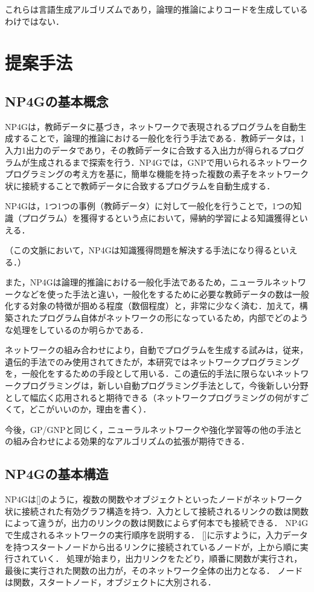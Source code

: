 \documentclass[exploratorypaper]{jsaiart} %
\begin{document}
これらは言語生成アルゴリズムであり，論理的推論によりコードを生成しているわけではない．

\section{提案手法}
\subsection{NP4Gの基本概念}
NP4Gは，教師データに基づき，ネットワークで表現されるプログラムを自動生成することで，論理的推論における一般化を行う手法である．教師データは，1入力1出力のデータであり，その教師データに合致する入出力が得られるプログラムが生成されるまで探索を行う．NP4Gでは，GNPで用いられるネットワークプログラミングの考え方を基に，簡単な機能を持った複数の素子をネットワーク状に接続することで教師データに合致するプログラムを自動生成する．

NP4Gは，1つ1つの事例（教師データ）に対して一般化を行うことで，1つの知識（プログラム）を獲得するという点において，帰納的学習による知識獲得といえる．

（この文脈において，NP4Gは知識獲得問題を解決する手法になり得るといえる．）

また，NP4Gは論理的推論における一般化手法であるため，ニューラルネットワークなどを使った手法と違い，一般化をするために必要な教師データの数は一般化する対象の特徴が掴める程度（数個程度）と，非常に少なく済む．加えて，構築されたプログラム自体がネットワークの形になっているため，内部でどのような処理をしているのか明らかである．

ネットワークの組み合わせにより，自動でプログラムを生成する試みは，従来，遺伝的手法でのみ使用されてきたが，本研究ではネットワークプログラミングを，一般化をするための手段として用いる．この遺伝的手法に限らないネットワークプログラミングは，新しい自動プログラミング手法として，今後新しい分野として幅広く応用されると期待できる（ネットワークプログラミングの何がすごくて，どこがいいのか，理由を書く）．

今後，GP/GNPと同じく，ニューラルネットワークや強化学習等の他の手法との組み合わせによる効果的なアルゴリズムの拡張が期待できる．

\subsection{NP4Gの基本構造}
NP4Gは[]のように，複数の関数やオブジェクトといったノードがネットワーク状に接続された有効グラフ構造を持つ．入力として接続されるリンクの数は関数によって違うが，出力のリンクの数は関数によらず何本でも接続できる．
NP4Gで生成されるネットワークの実行順序を説明する．
[]に示すように，入力データを持つスタートノードから出るリンクに接続されているノードが，上から順に実行されていく．
処理が始まり，出力リンクをたどり，順番に関数が実行され，最後に実行された関数の出力が，そのネットワーク全体の出力となる．
ノードは関数，スタートノード，オブジェクトに大別される．
\end{document}
